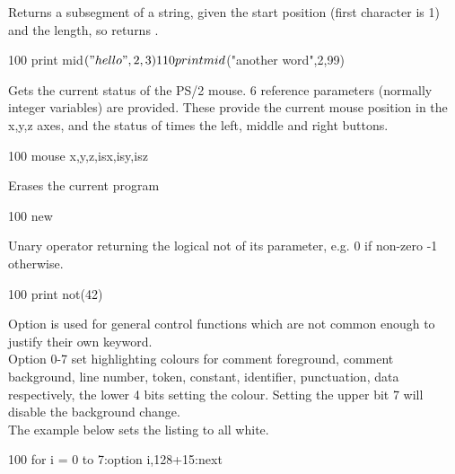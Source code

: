 \begin{entry}
Returns a subsegment of a string, given the start position (first character is 1) and the length, so  returns .

\begin{lstexample}
100 print mid$("hello",2,3)
110 print mid$("another word",2,99)
\end{lstexample}
\end{entry}

\begin{entry}
Gets the current status of the PS/2 mouse. 6 reference parameters (normally integer variables) are provided. These provide the current mouse position in the x,y,z axes, and the status of times the left, middle and right buttons.

\begin{lstexample}
100 mouse x,y,z,isx,isy,isz
\end{lstexample}
\end{entry}

\begin{entry}
Erases the current program

\begin{lstexample}
100 new
\end{lstexample}
\end{entry}

\begin{entry}
Unary operator returning the logical not of its parameter, e.g. 0 if non-zero -1 otherwise.

\begin{lstexample}
100 print not(42)
\end{lstexample}
\end{entry}

\begin{entry}
Option is used for general control functions which are not common enough to justify their own keyword.\\

Option 0-7 set highlighting colours for comment foreground, comment background, line number, token, constant, identifier, punctuation, data respectively, the lower 4 bits setting the colour. Setting the upper bit 7 will disable the background change.\\

The example below sets the listing to all white.

\begin{lstexample}
100 for i = 0 to 7:option i,128+15:next
\end{lstexample}
\end{entry}

